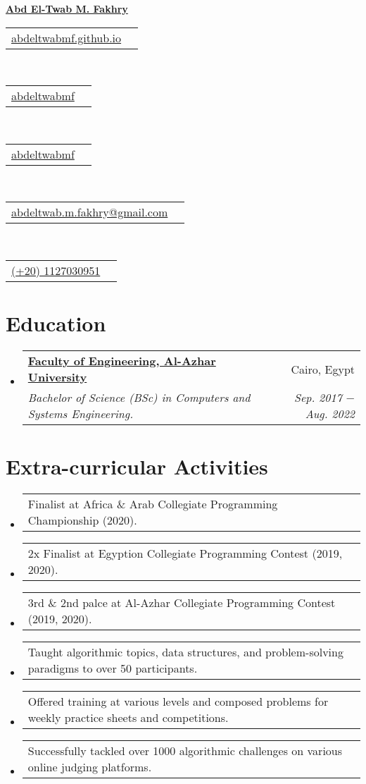 \documentclass[letterpaper, 11pt]{article}
\makeatletter
\newcommand{\education}[6] {
	\vspace{-1pt}\item[]
  \begin{tabular*}{1\textwidth}[t]{l@{\extracolsep{\fill}}r}
		#1 \href{#2}{\textbf{\color{RoyalBlue}#3}} & #4 \\
    \textit{\small #5} & \textit{\small #6} \\
  \end{tabular*}
  \vspace{-4pt}
}
\newcommand{\extracurricularactivity}[3] {
	\vspace{1pt}\item
  \begin{tabular*}{0.97\textwidth}[t]{l@{\extracolsep{\fill}}r}
		#1 & \href{#2}{\color{RoyalBlue}#3} \\
  \end{tabular*}
  \vspace{-4pt}
}
\newcommand{\name}[2] {
  \textbf{
    \href{#1}{\Huge{#2}}
  }
  \vspace{-4pt}
}
\newcommand{\contact}[4] {
  \begin{tabular}{lr}
    {\href{#1}{\color{#3} #2 #4}}
  \end{tabular}
  \vspace{-4pt}
}
\makeatother
\begin{document}
\name{https://abdeltwabmf.github.io}{Abd El-Twab M. Fakhry}

\begin{center}
  \small
  \contact
  {https://abdeltwabmf.github.io}
  {\faIcon{globe}}{RoyalBlue}{abdeltwabmf.github.io}\,
  \contact
  {https://www.linkedin.com/in/abdeltwabmf}
  {\faIcon{linkedin}}{RoyalBlue}{abdeltwabmf}\,
  \contact
  {https://github.com/AbdeltwabMF}
  {\faIcon{github}}{RoyalBlue}{abdeltwabmf}\,
  \contact
  {mailto:abdeltwab.m.fakhry@gmail.com}
  {\faIcon{envelope}}{RoyalBlue}{abdeltwab.m.fakhry@gmail.com}\,
  \contact
  {tel:+201127030951}
  {\faIcon{mobile-alt}}{RoyalBlue}{(+20) 1127030951}
\end{center}\vspace{8pt}

\section{Education}
\begin{itemize}[leftmargin=0pt]
  \education
  {\faIcon{university}}
	{https://eng-azhar.net/}
  {Faculty of Engineering, Al-Azhar University}{ Cairo, Egypt}
  {Bachelor of Science (BSc) in Computers and Systems Engineering.}{Sep. 2017 $-$ Aug. 2022}
\end{itemize}

\section{Extra-curricular Activities}
\begin{itemize}[leftmargin=*]
  \extracurricularactivity
  {Finalist at Africa \& Arab Collegiate Programming Championship (2020).}
  {https://icpc.global/ICPCID/S6R4YNB7PW7D}{\faIcon{link}}

  \extracurricularactivity
  {2x Finalist at Egyption Collegiate Programming Contest (2019, 2020).}
  {}{}

  \extracurricularactivity
  {3rd \& 2nd palce at Al-Azhar Collegiate Programming Contest (2019, 2020).}
  {}{}

  \extracurricularactivity
  {Taught algorithmic topics, data structures, and problem-solving paradigms to over 50 participants.}
  {https://sites.google.com/view/azharicpc/home}{\faIcon{link}}

  \extracurricularactivity
  {Offered training at various levels and composed problems for weekly practice sheets and competitions.}
  {}{}

  \extracurricularactivity
  {Successfully tackled over 1000 algorithmic challenges on various online judging platforms.}
  {}{}
 \end{itemize}
\end{document}
